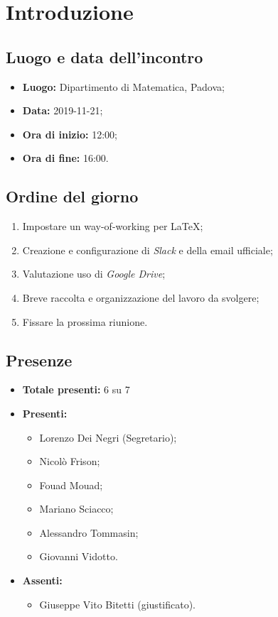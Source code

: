 \section*{Introduzione}

\subsection*{Luogo e data dell'incontro}
	\begin{itemize}
		\item \textbf{Luogo:} Dipartimento di Matematica, Padova;
		\item \textbf{Data:} 2019-11-21;
		\item \textbf{Ora di inizio:} 12:00;
		\item \textbf{Ora di fine:} 16:00.
	\end{itemize}

\subsection*{Ordine del giorno}
	\begin{enumerate}
		\item Impostare un way-of-working per \LaTeX{};
		\item Creazione e configurazione di \textit{Slack} e della email ufficiale;
		\item Valutazione uso di \textit{Google Drive};
		\item Breve raccolta e organizzazione del lavoro da svolgere;
		\item Fissare la prossima riunione.
	\end{enumerate}

\subsection*{Presenze}
	\begin{itemize}
		\item \textbf{Totale presenti:} 6 su 7
		\item \textbf{Presenti: }
			\begin{itemize}			
				\item Lorenzo Dei Negri (Segretario);
				\item Nicolò Frison;
				\item Fouad Mouad;
				\item Mariano Sciacco;
				\item Alessandro Tommasin;
				\item Giovanni Vidotto.
			\end{itemize}
		\item \textbf{Assenti: } 
			\begin{itemize}	
				\item Giuseppe Vito Bitetti (giustificato).
			\end{itemize}
	\end{itemize}


